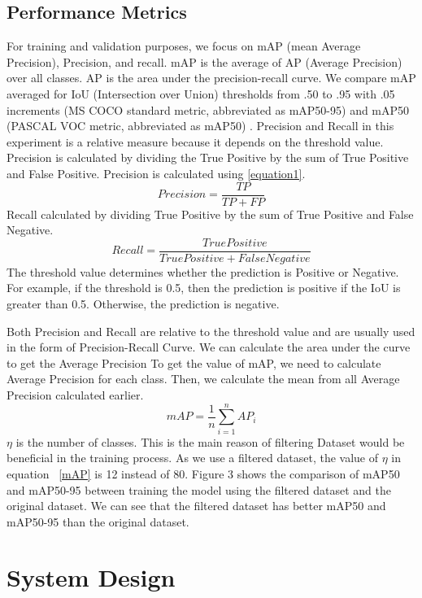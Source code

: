 \documentclass[conference]{IEEEtran}
\begin{document}
\subsection{Performance Metrics}
For training and validation purposes, we focus on mAP (mean Average Precision), Precision, and recall. mAP is the average of AP (Average Precision) over all classes. AP is the area under the precision-recall curve.
We compare mAP averaged for IoU (Intersection over Union) thresholds from .50 to .95 with .05 increments (MS COCO standard metric, abbreviated as mAP50-95) and mAP50 (PASCAL VOC metric, abbreviated as mAP50) \cite{COCO Dataset}. 
Precision and Recall in  this experiment is a relative measure because it depends on the threshold value.
Precision is calculated by dividing the True Positive by the sum of True Positive and False Positive. 
Precision is calculated using \eqref{equation1}.
\begin{equation}
Precision = \frac{TP}{TP+FP}
\label{equation1}
\end{equation}
Recall calculated by dividing True Positive by the sum of True Positive and False Negative.
\begin{equation}
Recall = \frac{True Positive}{TruePositive+FalseNegative}
\end{equation}
The threshold value determines whether the prediction is Positive or Negative. For example, if the threshold is 0.5, then the prediction is positive if the IoU is greater than 0.5. Otherwise, the prediction is negative.

Both Precision and Recall are relative to the threshold value and are usually used in the form of Precision-Recall Curve. We can calculate the area under the curve to get the Average Precision
To get the value of mAP, we need to calculate Average Precision for each class. Then, we calculate the mean from all Average Precision calculated earlier.
\begin{equation}
mAP = \frac{1}{n}\sum_{i=1}^{n}AP_i
\label{mAP}
\end{equation}
$\eta$ is the number of classes.
This is the main reason of filtering Dataset would be beneficial in the training process. As we use a filtered dataset, the value of $\eta$ in equation ~\ref{mAP} is 12 instead of 80.
Figure 3 shows the comparison of mAP50 and mAP50-95 between training the model using the filtered dataset and  the original dataset. We can see that the filtered dataset has better mAP50 and mAP50-95 than the original dataset.
\

\section{System Design}
\end{document}
